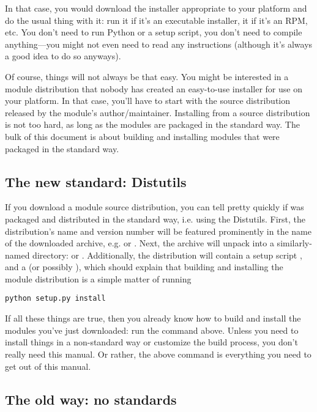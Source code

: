 \documentclass{howto}
\begin{document}
In that case, you would download the installer appropriate to your
platform and do the usual thing with it: run it if it's an executable
installer,  it if it's an RPM, etc.  You don't need to run
Python or a setup script, you don't need to compile anything---you might
not even need to read any instructions (although it's always a good idea
to do so anyways).

Of course, things will not always be that easy.  You might be interested
in a module distribution that nobody has created an easy-to-use
installer for use on your platform.  In that case, you'll have to start
with the source distribution released by the module's
author/maintainer.  Installing from a source distribution is not too
hard, as long as the modules are packaged in the standard way.  The bulk 
of this document is about building and installing modules that were
packaged in the standard way.


\subsection{The new standard: Distutils}
\label{sec:new-standard}

If you download a module source distribution, you can tell pretty
quickly if was packaged and distributed in the standard way, i.e. using
the Distutils.  First, the distribution's name and version number will
be featured prominently in the name of the downloaded archive, e.g.
 or .  Next, the archive
will unpack into a similarly-named directory:  or
.  Additionally, the distribution will contain a
setup script , and a  (or possibly
), which should explain that building and installing the
module distribution is a simple matter of running
\begin{verbatim}
python setup.py install
\end{verbatim}

If all these things are true, then you already know how to build and
install the modules you've just downloaded: run the command above.
Unless you need to install things in a non-standard way or customize the
build process, you don't really need this manual.  Or rather, the above
command is everything you need to get out of this manual.


\subsection{The old way: no standards}
\label{sec:old-way}
\end{document}

